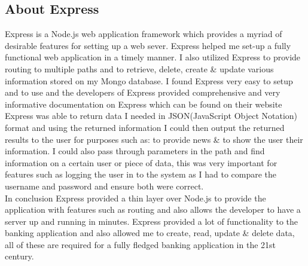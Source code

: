 \subsection{About Express}
Express is a Node.js web application framework which provides a myriad of desirable features for setting up a web sever.  Express helped me set-up a fully functional web application in a timely manner.  I also utilized Express to provide routing to multiple paths and to retrieve, delete, create \& update various information stored on my Mongo database.  I found Express very easy to setup and to use and the developers of Express provided comprehensive and very informative documentation on Express which can be found on their website\cite{ExpressDocs}
\\
 Express was able to return data I needed in JSON(JavaScript Object Notation) format and using the returned information I could then output the returned results to the user for purposes such as: to provide news \& to show the user their information.  I could also pass through parameters in the path and find information on a certain user or piece of data, this was very important for features such as logging the user in to the system as I had to compare the username and password and ensure both were correct.
 \\
 In conclusion Express provided a thin layer over Node.js to provide the application with features such as routing and also allows the developer to have a server up and running in minutes.  Express provided a lot of functionality to the banking application and also allowed me to create, read, update \& delete data, all of these are required for a fully fledged banking application in the 21st century.
